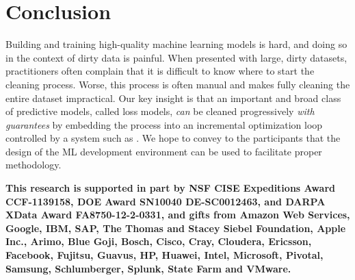 \section{Conclusion}
Building and training high-quality machine learning models is hard, and doing so in the context of dirty data is painful.
When presented with large, dirty datasets, practitioners often complain that it is difficult to know where to start the cleaning process.
Worse, this process is often manual and makes fully cleaning the entire dataset impractical.  
Our key insight is that an important and broad class of predictive models, called loss models, 
{\it can} be cleaned progressively {\it with guarantees} by embedding the process into an incremental optimization loop controlled by a system such as \sys.
We hope to convey to the participants that the design of the ML development environment can be used to facilitate proper methodology.

\vspace{0.5em}

\textbf{\scriptsize This research is supported in part by NSF CISE Expeditions Award CCF-1139158, DOE Award SN10040 DE-SC0012463, and DARPA XData Award FA8750-12-2-0331, and gifts from Amazon Web Services, Google, IBM, SAP, The Thomas and Stacey Siebel Foundation, Apple Inc., Arimo, Blue Goji, Bosch, Cisco, Cray, Cloudera, Ericsson, Facebook, Fujitsu, Guavus, HP, Huawei, Intel, Microsoft, Pivotal, Samsung, Schlumberger, Splunk, State Farm and VMware.}
